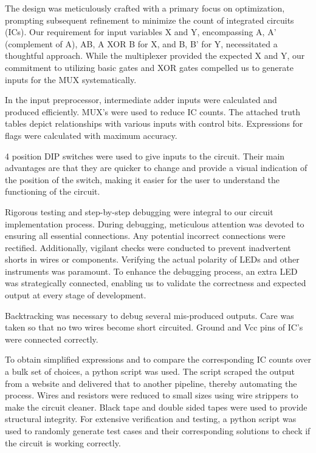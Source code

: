 \documentclass{article}
\begin{document}
The design was meticulously crafted with a primary focus on optimization, prompting subsequent refinement to minimize the count of integrated circuits (ICs). Our requirement for input variables X and Y, encompassing A, A' (complement of A), AB, A XOR B for X, and B, B' for Y, necessitated a thoughtful approach. While the multiplexer provided the expected X and Y, our commitment to utilizing basic gates and XOR gates compelled us to generate inputs for the MUX systematically. 

\vspace{2mm}

In the input preprocessor, intermediate adder inputs were calculated and produced efficiently. MUX's were used to reduce IC counts. The attached truth tables depict relationships with various inputs with control bits. Expressions for flags were calculated with maximum accuracy.

\vspace{2mm}

4 position DIP switches were used to give inputs to the circuit. Their main advantages are that they are quicker to change and provide a visual indication of the position of the switch, making it easier for the user to understand the functioning of the circuit.

\vspace{2mm}

Rigorous testing and step-by-step debugging were integral to our circuit implementation process. During debugging, meticulous attention was devoted to ensuring all essential connections. Any potential incorrect connections were rectified. Additionally, vigilant checks were conducted to prevent inadvertent shorts in wires or components. Verifying the actual polarity of LEDs and other instruments was paramount. To enhance the debugging process, an extra LED was strategically connected, enabling us to validate the correctness and expected output at every stage of development.

\vspace{2mm}

Backtracking was necessary to debug several mis-produced outputs. Care was taken so that no two wires become short circuited. Ground and Vcc pins of IC's were connected correctly.

\vspace{2mm}

To obtain simplified expressions and to compare the corresponding IC counts over a bulk set of choices, a python script was used. The script scraped the output from a website and delivered that to another pipeline, thereby automating the process. Wires and resistors were reduced to small sizes using wire strippers to make the circuit cleaner. Black tape and double sided tapes were used to provide structural integrity. For extensive verification and testing, a python script was used to randomly generate test cases and their corresponding solutions to check if the circuit is working correctly.
\end{document}
